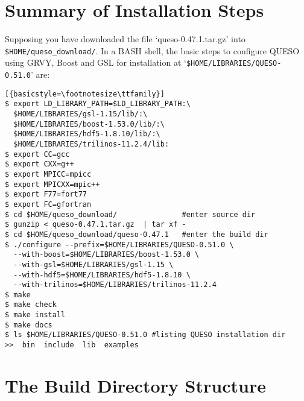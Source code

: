 \section{Summary of Installation Steps}\label{sec:summary}


Supposing you have downloaded the file `queso-0.47.1.tar.gz' into \texttt{\$HOME/queso\_download/}.
%
In a BASH shell, the basic steps to configure QUESO using GRVY, Boost and GSL for installation at 
`\verb+$HOME/LIBRARIES/QUESO-0.51.0+'  are:

\begin{lstlisting}[{basicstyle=\footnotesize\ttfamily}]
$ export LD_LIBRARY_PATH=$LD_LIBRARY_PATH:\
  $HOME/LIBRARIES/gsl-1.15/lib/:\
  $HOME/LIBRARIES/boost-1.53.0/lib/:\
  $HOME/LIBRARIES/hdf5-1.8.10/lib/:\
  $HOME/LIBRARIES/trilinos-11.2.4/lib:
$ export CC=gcc
$ export CXX=g++
$ export MPICC=mpicc
$ export MPICXX=mpic++
$ export F77=fort77
$ export FC=gfortran
$ cd $HOME/queso_download/               #enter source dir
$ gunzip < queso-0.47.1.tar.gz  | tar xf -
$ cd $HOME/queso_download/queso-0.47.1   #enter the build dir
$ ./configure --prefix=$HOME/LIBRARIES/QUESO-0.51.0 \
  --with-boost=$HOME/LIBRARIES/boost-1.53.0 \
  --with-gsl=$HOME/LIBRARIES/gsl-1.15 \
  --with-hdf5=$HOME/LIBRARIES/hdf5-1.8.10 \
  --with-trilinos=$HOME/LIBRARIES/trilinos-11.2.4
$ make 
$ make check
$ make install 
$ make docs
$ ls $HOME/LIBRARIES/QUESO-0.51.0 #listing QUESO installation dir
>>  bin  include  lib  examples
\end{lstlisting}

% 
% 


\section{The Build Directory Structure} \label{sc-source-dir-structure}

